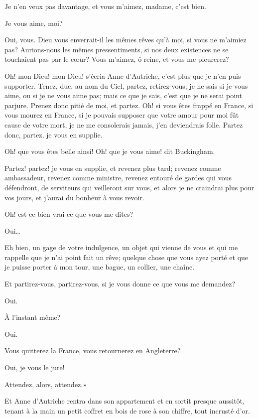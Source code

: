 \speak  Je n'en veux pas davantage, et vous m'aimez, madame, c'est bien. 

\speak  Je vous aime, moi? 

\speak  Oui, vous. Dieu vous enverrait-il les mêmes rêves qu'à moi, si vous ne m'aimiez pas? Aurions-nous les mêmes pressentiments, si nos deux existences ne se touchaient pas par le cœur? Vous m'aimez, ô reine, et vous me pleurerez? 

\speak  Oh! mon Dieu! mon Dieu! s'écria Anne d'Autriche, c'est plus que je n'en puis supporter. Tenez, duc, au nom du Ciel, partez, retirez-vous; je ne sais si je vous aime, ou si je ne vous aime pas; mais ce que je sais, c'est que je ne serai point parjure. Prenez donc pitié de moi, et partez. Oh! si vous êtes frappé en France, si vous mourez en France, si je pouvais supposer que votre amour pour moi fût cause de votre mort, je ne me consolerais jamais, j'en deviendrais folle. Partez donc, partez, je vous en supplie. 

\speak  Oh! que vous êtes belle ainsi! Oh! que je vous aime! dit Buckingham. 

\speak  Partez! partez! je vous en supplie, et revenez plus tard; revenez comme ambassadeur, revenez comme ministre, revenez entouré de gardes qui vous défendront, de serviteurs qui veilleront sur vous, et alors je ne craindrai plus pour vos jours, et j'aurai du bonheur à vous revoir. 

\speak  Oh! est-ce bien vrai ce que vous me dites? 

\speak  Oui\dots 

\speak  Eh bien, un gage de votre indulgence, un objet qui vienne de vous et qui me rappelle que je n'ai point fait un rêve; quelque chose que vous ayez porté et que je puisse porter à mon tour, une bague, un collier, une chaîne. 

\speak  Et partirez-vous, partirez-vous, si je vous donne ce que vous me demandez? 

\speak  Oui. 

\speak  À l'instant même? 

\speak  Oui. 

\speak  Vous quitterez la France, vous retournerez en Angleterre? 

\speak  Oui, je vous le jure! 

\speak  Attendez, alors, attendez.» 

Et Anne d'Autriche rentra dans son appartement et en sortit presque aussitôt, tenant à la main un petit coffret en bois de rose à son chiffre, tout incrusté d'or. 

